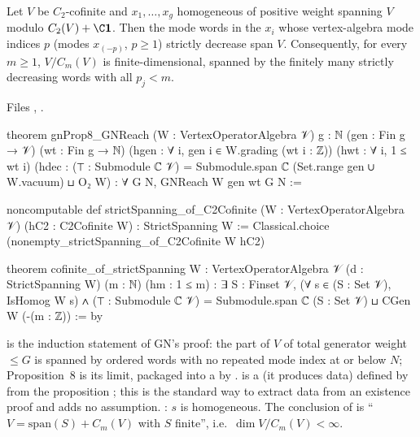 \begin{theorem}\label{l15:thm:gn}
Let $V$ be $C_2$-cofinite and $x_1,\dots,x_g$ homogeneous of positive weight spanning $V$ modulo $C_2(V)+\C\lfifteenvac$.
Then the mode words in the $x_i$ whose vertex-algebra mode indices $p$ (modes $x_{(-p)}$, $p\ge1$) strictly decrease
span $V$. Consequently, for every $m\ge1$, $V/C_m(V)$ is
finite-dimensional, spanned by the finitely many strictly decreasing words with all $p_j<m$.
\end{theorem}
\noindent Files ,
.
\begin{leancode}
theorem gnProp8_GNReach (W : VertexOperatorAlgebra 𝒱)
    {g : ℕ} (gen : Fin g → 𝒱) (wt : Fin g → ℕ)
    (hgen : ∀ i, gen i ∈ W.grading (wt i : ℤ))
    (hwt : ∀ i, 1 ≤ wt i)
    (hdec : (⊤ : Submodule ℂ 𝒱) =
      Submodule.span ℂ (Set.range gen ∪ {W.vacuum}) ⊔ O₂ W) :
    ∀ G N, GNReach W gen wt G N :=

noncomputable def strictSpanning_of_C2Cofinite (W : VertexOperatorAlgebra 𝒱)
    (hC2 : C2Cofinite W) : StrictSpanning W :=
  Classical.choice (nonempty_strictSpanning_of_C2Cofinite W hC2)

theorem cofinite_of_strictSpanning {W : VertexOperatorAlgebra 𝒱} (d : StrictSpanning W)
    (m : ℕ) (hm : 1 ≤ m) :
    ∃ S : Finset 𝒱, (∀ s ∈ (S : Set 𝒱), IsHomog W s) ∧
      (⊤ : Submodule ℂ 𝒱) = Submodule.span ℂ (S : Set 𝒱) ⊔ CGen W (-(m : ℤ)) := by
\end{leancode}

\begin{dictionary}
 is the induction statement of GN's proof: the part of $V$ of total generator weight $\le G$ is
spanned by ordered words with no repeated mode index at or below $N$; Proposition~8 is its limit, packaged into a
 by \allowbreak{}. \allowbreak{} is a 
(it produces data) defined by  from the proposition \allowbreak{}\allowbreak{};
this is the standard way to extract data from an existence proof and adds no assumption. : $s$ is
homogeneous. The conclusion of \allowbreak{} is ``$V=\mathrm{span}(S)+C_m(V)$ with $S$ finite'', i.e.\
$\dim V/C_m(V)<\infty$.
\end{dictionary}

